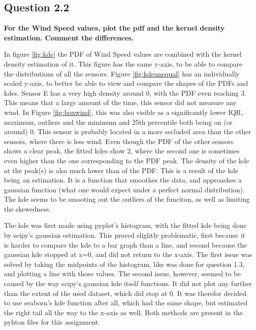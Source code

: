 \documentclass{report}
\begin{document}
	\subsection{Question 2.2}
	\textbf{For the Wind Speed values, plot the pdf and the kernel density estimation. Comment the differences.}
	
	In figure \ref{fig:kde} the PDF of Wind Speed values are combined with the kernel density estimation of it. This figure has the same y-axis, to be able to compare the distributions of all the sensors. Figure \ref{fig:kdeunequal} has an individually scaled y-axis, to better be able to view and compare the shapes of the PDFs and kdes. Sensor E has a very high density around 0, with the PDF even reaching 3. This means that a large amount of the time, this sensor did not measure any wind. In Figure \ref{fig:boxwind}, this was also visible as a significantly lower IQR, maximum, outliers and the minimum and 25th percentile both being on (or around) 0. This sensor is probably located in a more secluded area than the other sensors, where there is less wind. Even though the PDF of the other sensors shows a clear peak, the fitted kdes show 2, where the second one is sometimes even higher than the one corresponding to the PDF peak. The density of the kde at the peak(s) is also much lower than of the PDF. This is a result of the kde being an estimation. It is a function that smoothes the data, and approaches a gaussian function (what one would expect under a perfect normal distribution). The kde seems to be smooting out the outliers of the funciton, as well as limiting the skewedness.
	
	The kde was first made using pyplot's histogram, with the fitted kde being done by scipy's gaussian estimation. This proved slightly problematic, first because it is harder to compare the kde to a bar graph than a line, and second because the gaussian kde stopped at x=0, and did not return to the x-axis. The first issue was solved by taking the midpoints of the histogram, like was done for question 1.3, and plotting a line with those values. The second issue, however, seemed to be caused by the way scipy's gaussian kde itself functions. It did not plot any further than the extent of the used dataset, which did stop at 0. It was therefor decided to use seaborn's kde function after all, which had the same shape, but estimated the right tail all the way to the x-axis as well. Both methods are present in the pyhton files for this assignment.
	
\end{document}
